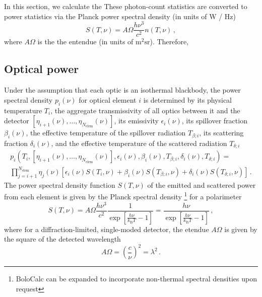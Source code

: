 In this section, we calculate the These photon-count statistics are converted to power statistics via the Planck power spectral density (in units of W / Hz) 
\begin{equation}
    S(T, \nu) = A \Omega \frac{h \nu^{3}}{c^{2}} n(T, \nu) \, ,
    \label{eq:planck_spectral_density}
\end{equation}
where $A \Omega$ is the the entendue (in units of $\mathrm{m^{2} sr}$). Therefore, 


\subsection{Optical power}
\label{sec:sensitivity_optical_power_detail}

Under the assumption that each optic is an isothermal blackbody, the power spectral density $p_{i}(\nu)$ for optical element $i$ is determined by its physical temperature $T_{i}$, the aggregate transmissivity of all optics between it and the detector $\left[ \eta_{i+1} (\nu) , \ldots , \eta_{N_{\mathrm{elem}}} (\nu) \right]$, its emissivity $\epsilon_{i} (\nu)$, its spillover fraction $\beta_{i} (\nu)$, the effective temperature of the spillover radiation $T_{\beta ; i}$, its scattering fraction $\delta_{i} (\nu)$, and the effective temperature of the scattered radiation $T_{\delta ; i}$
\begin{align}
    p_{i} \left( T_{i}, \left[ \eta_{i+1} (\nu) , \ldots , \eta_{N_{\mathrm{elem}}} (\nu) \right], \epsilon_{i}(\nu), \beta_{i}(\nu), T_{\beta ; i}, \delta_{i} (\nu), T_{\delta ; i} \right) = \\
    \prod_{j = i + 1}^{N_{\mathrm{elem}}} \eta_{j} (\nu) \left[ \epsilon_{i} (\nu) S(T_{i}, \nu) + \beta_{i}(\nu) S(T_{\beta;i}, \nu) + \delta_{i}(\nu) S(T_{\delta; i}, \nu) \right] \, .
    \label{eq:pow_spec_density}
\end{align}
The power spectral density function $S(T, \nu)$ of the emitted and scattered power from each element is given by the Planck spectral density \footnote{BoloCalc can be expanded to incorporate non-thermal spectral densities upon request} for a polarimeter
\begin{equation}
    S(T, \nu) = A \Omega \frac{h \nu^{3}}{c^{2}} \frac{1}{\exp \left[ \frac{h \nu}{k_{\mathrm{B}} T} - 1 \right]} = \frac{h \nu}{\exp \left[ \frac{h \nu}{k_{\mathrm{B}} T} - 1 \right]} \, ,
    \label{eq:planck_spec}
\end{equation}
where for a diffraction-limited, single-moded detector, the etendue $A \Omega$ is given by the square of the detected wavelength
\begin{equation}
    A \Omega = \left( \frac{c}{\nu} \right)^{2} = \lambda^{2} \, .
    \label{eq:aomega}
\end{equation}

